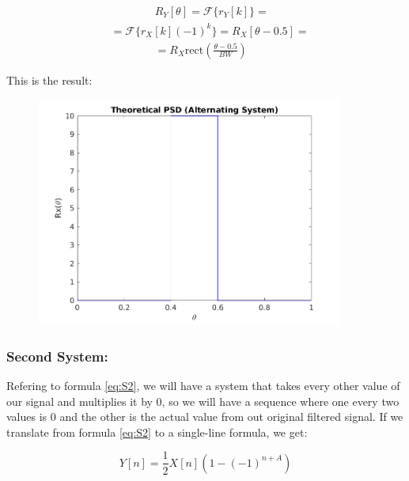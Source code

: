 \documentclass[a4paper,11pt]{article}
\begin{document}
\begin{equation}\label{eq:R_hw}
  \begin{split}
    & \qquad\qquad R_Y[\theta] = \mathcal{F}\{r_Y[k]\} = \\
    & = \mathcal{F}\{r_X[k](-1)^k\} = R_X[\theta - 0.5] = \\
    & \qquad\qquad = R_X \text{rect}(\frac{\theta - 0.5}{BW})
  \end {split}
\end{equation}

\newpage

This is the result:

\begin{figure}[!hp]
    \begin{center}
      \includegraphics[width=0.9\textwidth]{images/study4/R_th_a.png}
    \end{center}
\end{figure}

\subsubsection{Second System:}

Refering to formula \eqref{eq:S2}, we will have a system that takes every other
value of our signal and multiplies it by 0, so we will have a sequence where
one every two values is 0 and the other is the actual value from out original
filtered signal. If we translate from formula \eqref{eq:S2} to a single-line
formula, we get:

\begin{equation}\label{eq:S2_2}
  Y[n] = \displaystyle\frac{1}{2}X[n](1-(-1)^{n+A})
\end{equation}
\end{document}
